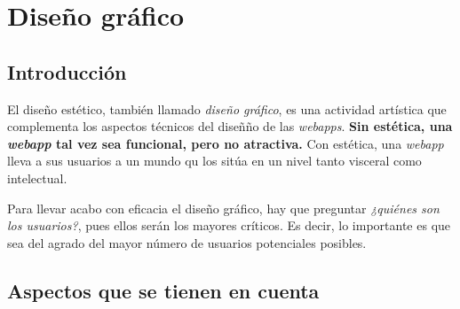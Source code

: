 

	\section{Diseño gráfico} %
	\label{sec:grafico}
	
	\subsection{Introducción} %
		\label{sub:graf_introduccion}
	
		El diseño estético, también llamado \textit{diseño gráfico}, es una actividad artística que complementa los aspectos técnicos del diseñño de las \textit{webapps}. \textbf{Sin estética, una \textit{webapp} tal vez sea funcional, pero no atractiva.} Con estética, una \textit{webapp} lleva a sus usuarios a un mundo qu los sitúa en un nivel tanto visceral como intelectual.
		
		Para llevar acabo con eficacia el diseño gráfico, hay que preguntar \textit{¿quiénes son los usuarios?}, pues ellos serán los mayores críticos. Es decir, lo importante es que sea del agrado del mayor número de usuarios potenciales posibles.
		
		
	\subsection{Aspectos que se tienen en cuenta} %
	\label{sub:graf_aspectos_que_se_tienen_en_cuenta}
	
